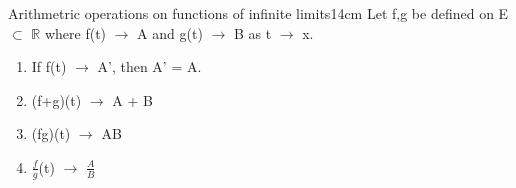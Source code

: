     \vspace{0.5cm}



    \begin{wtheorem}{Arithmetric operations on functions of infinite limits}{14cm}
        Let f,g be defined on E $\subset$ $\mathbb{R}$ where
        f(t) $\rightarrow$ A and g(t) $\rightarrow$ B as t $\rightarrow$ x.
    \end{wtheorem}

    \begin{enumerate}[label=(\alph*), leftmargin=2cm, itemsep=0.1cm]
        \item If f(t) $\rightarrow$ A', then A' = A.
        
        \item (f+g)(t) $\rightarrow$ A + B
        
        \item (fg)(t) $\rightarrow$ AB
        
        \item $\frac{f}{g}$(t) $\rightarrow$ $\frac{A}{B}$
    \end{enumerate}